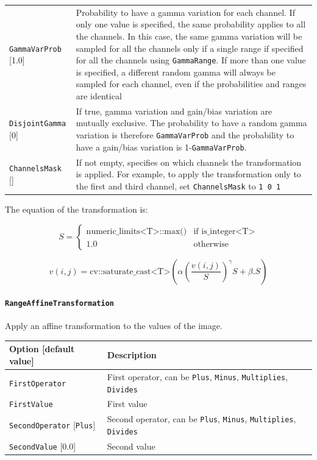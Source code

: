 \documentclass[a4paper,11pt,oneside]{article}
\begin{document}
\begin{center}
\begin{tabular}{| p{5cm} | p{10cm} | }
  \lstinline!GammaVarProb! [1.0] & Probability to have a gamma variation for each channel. If only one value is specified, the same probability applies to all the channels. In this case, the same gamma variation will be sampled for all the channels only if a single range if specified for all the channels using \lstinline!GammaRange!. If more than one value is specified, a different random gamma will always be sampled for each channel, even if the probabilities and ranges are identical \\
  \lstinline!DisjointGamma! [0] & If true, gamma variation and gain/bias variation are mutually exclusive. The probability to have a random gamma variation is therefore \lstinline!GammaVarProb! and the probability to have a gain/bias variation is 1-\lstinline!GammaVarProb!. \\
  \lstinline!ChannelsMask! [] & If not empty, specifies on which channels the transformation is applied. For example, to apply the transformation only to the first and third channel, set \lstinline!ChannelsMask! to \lstinline!1 0 1! \\
 \hline
\end{tabular}
\end{center}

The equation of the transformation is:

\[ S =
   \begin{cases}
      \text{numeric\_limits<T>::max()}  &  \text{if } \text{is\_integer<T>} \\
      1.0   & \text{otherwise}
   \end{cases}   \]

\[ v(i,j) = \text{cv::saturate\_cast<T>}\left(\alpha \left(\frac{v(i,j)}{S}\right)^{\gamma} S + \beta.S\right) \]



\paragraph{\texorpdfstring{%
\lstinline[basicstyle=\ttfamily\bfseries]!RangeAffineTransformation!}
{RangeAffineTransformation}}
Apply an affine transformation to the values of the image.

\begin{center}
 \begin{tabular}{| p{5cm} | p{10cm} | }
 \hline
 Option [default value] & Description\\
 \hline\hline
  \cellcolor{requiredcolor}\lstinline!FirstOperator! & First operator, can be
   \lstinline!Plus!, \lstinline!Minus!, \lstinline!Multiplies!,
   \lstinline!Divides!  \\
  \cellcolor{requiredcolor}\lstinline!FirstValue! & First value \\
  \lstinline!SecondOperator! [\lstinline!Plus!] & Second operator, can be
  \lstinline!Plus!, \lstinline!Minus!, \lstinline!Multiplies!,
  \lstinline!Divides!  \\
  \lstinline!SecondValue! [0.0] & Second value \\
 \hline
\end{tabular}
\end{center}
\end{document}
